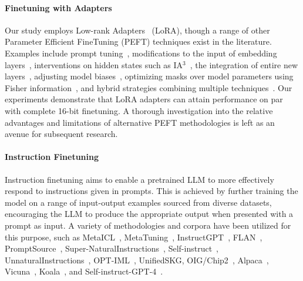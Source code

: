 \paragraph{Finetuning with Adapters} Our study employs Low-rank Adapters~\citep{hu2021lora} (LoRA), though a range of other Parameter Efficient FineTuning (PEFT) techniques exist in the literature. Examples include prompt tuning~\citep{qin2021learning,lester2021power,li2021prefix}, modifications to the input of embedding layers~\citep{an2022input}, interventions on hidden states such as IA$^3$~\citep{liu2022few}, the integration of entire new layers~\citep{houlsby2019parameter}, adjusting model biases~\citep{zaken2021bitfit}, optimizing masks over model parameters using Fisher information~\citep{sung2021training}, and hybrid strategies combining multiple techniques~\citep{henderson2021compacter}. Our experiments demonstrate that LoRA adapters can attain performance on par with complete 16-bit finetuning. A thorough investigation into the relative advantages and limitations of alternative PEFT methodologies is left as an avenue for subsequent research.

\paragraph{Instruction Finetuning} Instruction finetuning aims to enable a pretrained LLM to more effectively respond to instructions given in prompts. This is achieved by further training the model on a range of input-output examples sourced from diverse datasets, encouraging the LLM to produce the appropriate output when presented with a prompt as input. A variety of methodologies and corpora have been utilized for this purpose, such as MetaICL~\citep{min2021metaicl}, MetaTuning~\citep{zhong2021adapting}, InstructGPT~\citep{ouyang2022training}, FLAN~\citep{wei2021finetuned,chung2022scaling}, PromptSource~\citep{bach2022promptsource}, Super-NaturalInstructions~\citep{wang2022super,sanh2021multitask}, Self-instruct~\citep{wang2022self}, UnnaturalInstructions~\citep{honovich2022unnatural}, OPT-IML~\citep{iyer2022opt}, UnifiedSKG\citep{xie2022unifiedskg}, OIG/Chip2~\citep{laion2023}, Alpaca~\citep{alpaca}, Vicuna~\citep{vicuna2023}, Koala~\citep{koala_blogpost_2023}, and Self-instruct-GPT-4~\citep{peng2023instruction}.

